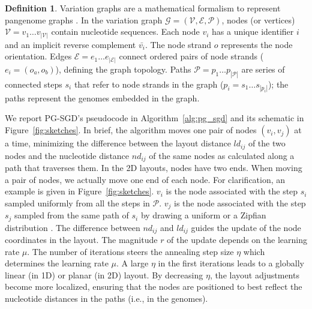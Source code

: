 \documentclass{bioinfo}
\theoremstyle{definition}
\newtheorem{definition}{Definition}[section]
\begin{document}
	\begin{definition}
		\label{def:vg}
		Variation graphs are a mathematical formalism to represent pangenome graphs \citep{Garrison_2019_thesis}.
		In the variation graph $\mathcal{G} = (\mathcal{V}, \mathcal{E}, \mathcal{P})$, nodes (or vertices) $\mathcal{V} = v_1\ldots v_{|\mathcal{V}|}$ contain nucleotide sequences.
		Each node $v_i$ has a unique identifier $i$ and an implicit reverse complement $\bar{v_i}$.
		The node strand $o$ represents the node orientation.
		Edges $\mathcal{E} = e_1\ldots e_{|\mathcal{E}|}$ connect ordered pairs of node strands ($e_i = ( o_a, o_b )$), defining the graph topology.
		Paths $\mathcal{P} = p_1\ldots p_{|\mathcal{P}|}$ are series of connected steps $s_i$ that refer to node strands in the graph ($p_i = s_1 \ldots s_{|p_i|}$); the paths represent the genomes embedded in the graph.
	\end{definition}
	
	We report PG-SGD's pseudocode in Algorithm~\ref{alg:pg_sgd} and its schematic in Figure~\ref{fig:sketches}.
	In brief, the algorithm moves one pair of nodes $( v_i, v_j )$ at a time, minimizing the difference between the layout distance $ld_{ij}$ of the two nodes and the nucleotide distance $nd_{ij}$ of the same nodes as calculated along a path that traverses them.
	In the 2D layouts, nodes have two ends.
	When moving a pair of nodes, we actually move one end of each node. For clarification, an example is given in Figure~\ref{fig:sketches}.
	$v_i$ is the node associated with the step $s_i$ sampled uniformly from all the steps in $\mathcal{P}$.
	$v_j$ is the node associated with the step $s_j$ sampled from the same path of $s_i$ by drawing a uniform or a Zipfian distribution \citep{Zipf1932}.
	The difference between $nd_{ij}$ and $ld_{ij}$ guides the update of the node coordinates in the layout.
	The magnitude $r$ of the update depends on the learning rate $\mu$.
	The number of iterations steers the annealing step size $\eta$ which determines the learning rate $\mu$.
	A large $\eta$ in the first iterations leads to a globally linear (in 1D) or planar (in 2D) layout.
	By decreasing $\eta$, the layout adjustments become more localized, ensuring that the nodes are positioned to best reflect the nucleotide distances in the paths (i.e., in the genomes).

	
\end{document}
